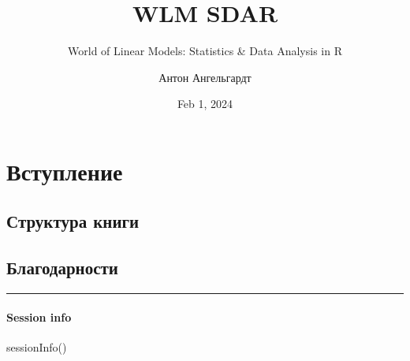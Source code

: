 \documentclass[
  letterpaper,
]{scrbook}
\title{WLM SDAR}
\subtitle{World of Linear Models: Statistics \& Data Analysis in R}
\author{Антон Ангельгардт}
\date{Feb 1, 2024}
\newenvironment{Shaded}{}{}
\newcommand{\FunctionTok}[1]{\textcolor[rgb]{0.44,0.26,0.76}{#1}}
\newcommand{\NormalTok}[1]{\textcolor[rgb]{0.14,0.16,0.18}{#1}}
\renewcommand*\contentsname{Содержание}
\newcommand\contentsname{Содержание}
\theoremstyle{definition}
\theoremstyle{remark}
\begin{document}
\frontmatter
\maketitle

\renewcommand*\contentsname{Содержание}
{
\setcounter{tocdepth}{2}
\tableofcontents
}
\mainmatter
{}

\chapter*{Вступление}\label{preface}


\section*{Структура книги}\label{book_structure}


\section*{Благодарности}\label{thanks}


\begin{center}\rule{0.5\linewidth}{0.5pt}\end{center}

\subsubsection*{Session info}\label{session-info}

\begin{Shaded}
\begin{Highlighting}[]
\FunctionTok{sessionInfo}\NormalTok{()}
\end{Highlighting}
\end{Shaded}
\end{document}
